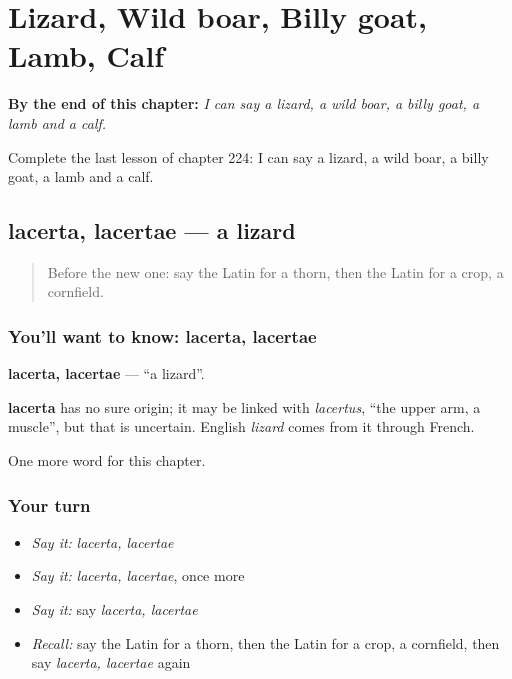 
\chapter{Lizard, Wild boar, Billy goat, Lamb, Calf}
\label{ch:la-lizard-wild-boar-billy-goat-lamb-calf}

\begin{chapteropening}
\textbf{By the end of this chapter:} \emph{I can say a lizard, a wild boar, a billy goat, a lamb and a calf.}

Complete the last lesson of chapter 224: I can say a lizard, a wild boar, a billy goat, a lamb and a calf.
\end{chapteropening}

\section[lacerta, lacertae]{lacerta, lacertae — a lizard}

\label{lesson:LA-C224-lacerta}



\begin{quote}
Before the new one: say the Latin for a thorn, then the Latin for a crop, a cornfield.
\end{quote}

\subsection*{You'll want to know: lacerta, lacertae}
\textbf{lacerta, lacertae} — \textquotedblleft{}a lizard\textquotedblright{}.

\begin{cousinweb}
\textbf{lacerta} has no sure origin; it may be linked with \emph{lacertus}, \textquotedblleft{}the upper arm, a muscle\textquotedblright{}, but that is uncertain. English \emph{lizard} comes from it through French.
\end{cousinweb}

\begin{grammarlens}[title={What you've built}]
One more word for this chapter.
\end{grammarlens}

\subsection*{Your turn}
\begin{itemize}
\raggedright
  \item \emph{Say it:} \emph{lacerta, lacertae}
  \item \emph{Say it:} \emph{lacerta, lacertae}, once more
  \item \emph{Say it:} say \emph{lacerta, lacertae}
  \item \emph{Recall:} say the Latin for a thorn, then the Latin for a crop, a cornfield, then say \emph{lacerta, lacertae} again
\end{itemize}

